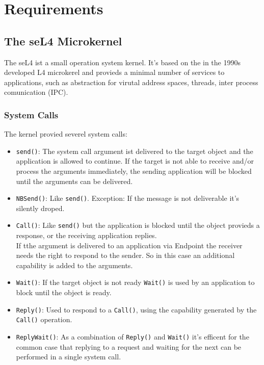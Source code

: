 \documentclass[pdftex,11pt,a4paper]{article}
\begin{document}
	
	\clearpage
	
	\section{Requirements}
	\subsection{The seL4 Microkernel}
	The seL4 \cite{sel4} ist a small operation system kernel. It's based on the in the 1990s developed L4 microkerel and provieds a minimal number of services to applications, such as abstraction for virutal address spaces, threads, inter process comunication (IPC). 
	
	\subsubsection{System Calls}
	The kernel provied severel system calls: \\
	\begin{itemize}
	\item \texttt{send()}: The system call argument ist delivered to the target object and the application is allowed to continue. If the target is not able to receive and/or process the arguments immediately, the sending application will be blocked until the arguments can be delivered.
	\item \texttt{NBSend()}: Like \texttt{send()}. Exception: If the message is not deliverable it's silently droped.
	\item \texttt{Call()}: Like \texttt{send()} but the application is blocked until the object provieds a response, or the receiving application replies. \\
	If tthe argument is delivered to an application via Endpoint the receiver needs the right to respond to the sender. So in this case an additional capability is added to the arguments. 
	\item \texttt{Wait()}: If the target object is not ready \texttt{Wait()} is used by an application to block until the object is ready. 
	\item \texttt{Reply()}: Used to respond to a \texttt{Call()}, using the capability generated by the \texttt{Call()} operation.
	\item \texttt{ReplyWait()}: As a combination of \texttt{Reply()} and \texttt{Wait()} it's efficent for the common case that replying to a request and waiting for the next can be performed in a single system call. 
	\end{itemize}
	\newpage
\end{document}
